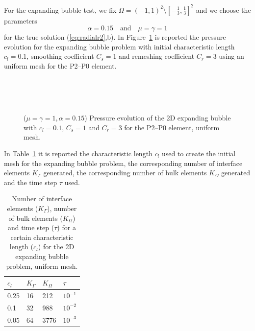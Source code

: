 \documentclass[a4paper,12pt,onecolumn]{article}
\begin{document}
For the expanding bubble test, we fix $\Omega = (-1,1)^2 \setminus [-\frac13,\frac13]^2$ and we choose the parameters
\begin{equation*}
\alpha = 0.15 \quad\text{and}\quad \mu = \gamma = 1
\end{equation*}
for the true solution (\ref{eq:radialr2},b). In Figure~\ref{fig:expanding_bubble_uniform} is reported the pressure evolution for the expanding bubble problem with initial characteristic length $c_l=0.1$, smoothing coefficient $C_s=1$ and remeshing coefficient $C_r=3$ using an uniform mesh for the P2--P0 element.
\begin{figure}[htbp]
  \centering
  \\
  \quad
  \\
  \quad
  \\
  \caption{($\mu=\gamma=1,\alpha = 0.15$) Pressure evolution of the 2D expanding bubble with $c_l=0.1$, $C_s=1$ and $C_r=3$ for the P2--P0 element, uniform mesh.}
  \label{fig:expanding_bubble_uniform}
\end{figure}

In Table~\ref{tab:expandingbubble2Delements} it is reported the characteristic length $c_l$ used to create the initial mesh for the expanding bubble problem, the corresponding number of interface elements $K_\Gamma$ generated, the corresponding number of bulk elements $K_\Omega$ generated and the time step $\tau$ used. 
\begin{table}
 \center
\begin{tabular}{llll}
\hline
$c_l$ & $K_\Gamma$ & $K_\Omega$ & $\tau$\\
\hline
0.25 & 16 & 212 & $10^{-1}$ \\
0.1 & 32 & 988 & $10^{-2}$ \\
0.05 & 64 & 3776 & $10^{-3}$ \\
\hline
\end{tabular}
\caption{Number of interface elements ($K_\Gamma$), number of bulk elements ($K_\Omega$) and time step ($\tau$) for a certain characteristic length ($c_l$) for the 2D expanding bubble problem, uniform mesh.}
\label{tab:expandingbubble2Delements}
\end{table}
\end{document}
